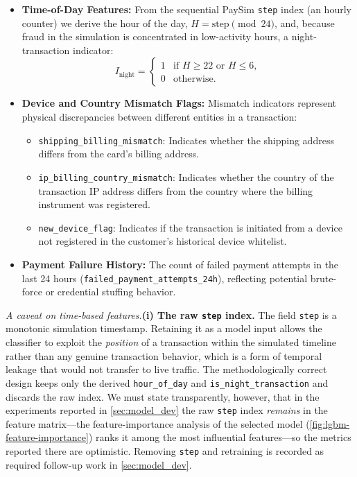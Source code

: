 \begin{itemize}
    \item \textbf{Time-of-Day Features:} From the sequential PaySim \texttt{step} index (an hourly counter) we derive the hour of the day, $H = \text{step} \pmod{24}$, and, because fraud in the simulation is concentrated in low-activity hours, a night-transaction indicator:
    \begin{equation}
        I_{\text{night}} = \begin{cases}
        1 & \text{if } H \ge 22 \text{ or } H \le 6,\\
        0 & \text{otherwise.}
        \end{cases}
        \label{eq:night}
    \end{equation}
    \item \textbf{Device and Country Mismatch Flags:} Mismatch indicators represent physical discrepancies between different entities in a transaction:
    \begin{itemize}
        \item \texttt{shipping\_billing\_mismatch}: Indicates whether the shipping address differs from the card's billing address.
        \item \texttt{ip\_billing\_country\_mismatch}: Indicates whether the country of the transaction IP address differs from the country where the billing instrument was registered.
        \item \texttt{new\_device\_flag}: Indicates if the transaction is initiated from a device not registered in the customer's historical device whitelist.
    \end{itemize}
    \item \textbf{Payment Failure History:} The count of failed payment attempts in the last 24 hours (\texttt{failed\_payment\_attempts\_24h}), reflecting potential brute-force or credential stuffing behavior.
\end{itemize}

\noindent\textit{A caveat on time-based features.}\;\textbf{(i) The raw \texttt{step} index.} The field \texttt{step} is a monotonic simulation timestamp. Retaining it as a model input allows the classifier to exploit the \emph{position} of a transaction within the simulated timeline rather than any genuine transaction behavior, which is a form of temporal leakage that would not transfer to live traffic. The methodologically correct design keeps only the derived \texttt{hour\_of\_day} and \texttt{is\_night\_transaction} and discards the raw index. We must state transparently, however, that in the experiments reported in \cref{sec:model_dev} the raw \texttt{step} index \emph{remains} in the feature matrix---the feature-importance analysis of the selected model (\cref{fig:lgbm-feature-importance}) ranks it among the most influential features---so the metrics reported there are optimistic. Removing \texttt{step} and retraining is recorded as required follow-up work in \cref{sec:model_dev}.

